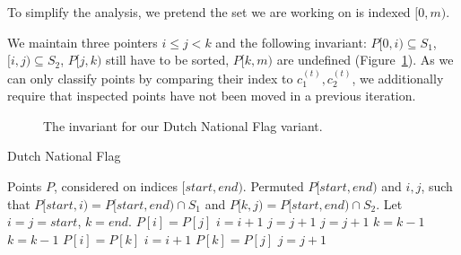 To simplify the analysis, we pretend the set we are working on is indexed
$[0, m)$.

We maintain three pointers $i \leq j < k$ and the following invariant: 
$P[0, i) \subseteq S_1$, $[i, j) \subseteq S_2$, $P[j, k)$ still have to be
sorted, $P[k, m)$ are undefined (Figure~\ref{fig:dnf}). As we can only 
classify points by comparing their index to $c_1^{(t)}, c_2^{(t)}$, we 
additionally require that inspected points have not been moved in a previous
iteration.

\begin{figure}[ht]
    \caption{The invariant for our Dutch National Flag variant.}
    \label{fig:dnf}
\end{figure}

\begin{algorithm}[ht]
\begin{algorithmic}[1]
    \caption{Dutch National Flag}\label{alg:dnf}
    \Require Points $P$, considered on indices $[start, end)$.
    \Ensure Permuted $P[start, end)$ and $i, j$, such that
            $P[start, i) = P[start, end) \cap S_1$ and
            $P[k, j) = P[start, end) \cap S_2$.
    \State Let $i = j = start$, $k = end$.
            \State $P[i] = P[j]$
            \State $i = i + 1$
            \State $j = j + 1$
            \State $j = j + 1$
        \Else
            \State $k = k - 1$
                \State $k = k - 1$
                    \State \Return{}
                \EndIf
            \EndWhile
                \State $P[i] = P[k]$
                \State $i = i + 1$
            \EndIf
            \State $P[k] = P[j]$
            \State $j = j + 1$
        \EndIf
    \EndWhile
\end{algorithmic}
\end{algorithm}

